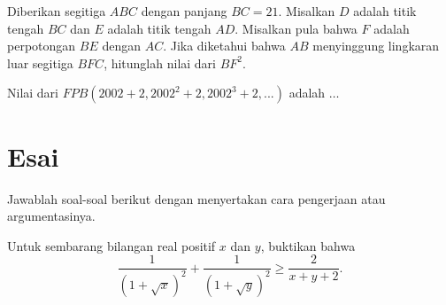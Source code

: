\documentclass[12pt]{scrartcl}
\begin{document}
	
	
	\begin{soalbaru}
		Diberikan segitiga $ABC$ dengan panjang $BC = 21$. Misalkan $D $ adalah titik tengah
		$BC $ dan $E $ adalah titik tengah $AD$. Misalkan pula bahwa $F $ adalah perpotongan $BE$
		dengan $AC$. Jika diketahui bahwa $AB $ menyinggung lingkaran luar segitiga $BFC$,
		hitunglah nilai dari $BF^2$.
	\end{soalbaru}
	
	\begin{soalbaru}
		Nilai dari $FPB(2002+2,2002^2+2,2002^3+2,...)$ adalah $\dots$
	\end{soalbaru}
	
	
	
	
	
	\section{Esai}
	Jawablah soal-soal berikut dengan menyertakan cara pengerjaan atau argumentasinya.
	
	\begin{soalbaru}
	Untuk sembarang bilangan real positif $x$ dan $y$, buktikan bahwa $$\dfrac{1}{(1+\sqrt{x})^2}+\dfrac{1}{(1+\sqrt{y})^2} \ge \dfrac{2}{x+y+2}.$$
	\end{soalbaru}
	
\end{document}
